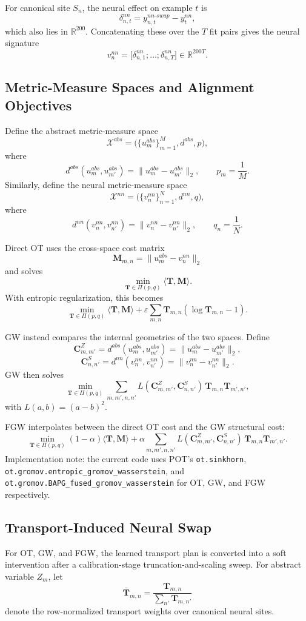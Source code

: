 \documentclass[11pt]{article}
\newcommand{\R}{\mathbb{R}}
\newcommand{\Tplan}{\mathbf{T}}
\newcommand{\SiteCost}{\mathbf{C}^{S}}
\newcommand{\AbsCost}{\mathbf{C}^{Z}}
\newcommand{\CrossCost}{\mathbf{M}}
\begin{document}
For canonical site $S_n$, the neural effect on example $t$ is
\[
\delta_{n,t}^{nn}
=
y_{n,t}^{nn\text{-}swap} - y_t^{nn},
\]
which also lies in $\R^{200}$. Concatenating these over the $T$ fit pairs gives the neural signature
\[
v_n^{nn}
=
\bigl[\delta_{n,1}^{nn}; \dots; \delta_{n,T}^{nn}\bigr]
\in \R^{200T}.
\]

\subsection{Metric-Measure Spaces and Alignment Objectives}
Define the abstract metric-measure space
\[
\mathcal{X}^{abs}
=
\bigl(\{u_m^{abs}\}_{m=1}^{M}, d^{abs}, p\bigr),
\]
where
\[
d^{abs}(u_m^{abs}, u_{m'}^{abs}) = \|u_m^{abs} - u_{m'}^{abs}\|_2,
\qquad
p_m = \frac{1}{M}.
\]
Similarly, define the neural metric-measure space
\[
\mathcal{X}^{nn}
=
\bigl(\{v_n^{nn}\}_{n=1}^{N}, d^{nn}, q\bigr),
\]
where
\[
d^{nn}(v_n^{nn}, v_{n'}^{nn}) = \|v_n^{nn} - v_{n'}^{nn}\|_2,
\qquad
q_n = \frac{1}{N}.
\]

Direct OT uses the cross-space cost matrix
\[
\CrossCost_{m,n} = \|u_m^{abs} - v_n^{nn}\|_2
\]
and solves
\[
\min_{\Tplan \in \Pi(p,q)} \langle \Tplan, \CrossCost \rangle.
\]
With entropic regularization, this becomes
\[
\min_{\Tplan \in \Pi(p,q)} \langle \Tplan, \CrossCost \rangle
+ \varepsilon \sum_{m,n} \Tplan_{m,n}(\log \Tplan_{m,n} - 1).
\]

GW instead compares the internal geometries of the two spaces. Define
\[
\AbsCost_{m,m'} = d^{abs}(u_m^{abs}, u_{m'}^{abs}) = \|u_m^{abs} - u_{m'}^{abs}\|_2,
\]
\[
\SiteCost_{n,n'} = d^{nn}(v_n^{nn}, v_{n'}^{nn}) = \|v_n^{nn} - v_{n'}^{nn}\|_2.
\]
GW then solves
\[
\min_{\Tplan \in \Pi(p,q)}
\sum_{m,m',n,n'}
L\!\left(\AbsCost_{m,m'}, \SiteCost_{n,n'}\right)\,
\Tplan_{m,n}\Tplan_{m',n'},
\]
with $L(a,b)=(a-b)^2$.

FGW interpolates between the direct OT cost and the GW structural cost:
\[
\min_{\Tplan \in \Pi(p,q)}
(1-\alpha)\langle \Tplan, \CrossCost \rangle
+
\alpha
\sum_{m,m',n,n'}
L\!\left(\AbsCost_{m,m'}, \SiteCost_{n,n'}\right)\,
\Tplan_{m,n}\Tplan_{m',n'}.
\]
Implementation note: the current code uses POT's \texttt{ot.sinkhorn}, \texttt{ot.gromov.entropic\_gromov\_wasserstein}, and \texttt{ot.gromov.BAPG\_fused\_gromov\_wasserstein} for OT, GW, and FGW respectively.

\subsection{Transport-Induced Neural Swap}
For OT, GW, and FGW, the learned transport plan is converted into a soft intervention after a calibration-stage truncation-and-scaling sweep. For abstract variable $Z_m$, let
\[
\bar{\Tplan}_{m,n}
=
\frac{\Tplan_{m,n}}{\sum_{n'} \Tplan_{m,n'}}
\]
denote the row-normalized transport weights over canonical neural sites.
\end{document}
